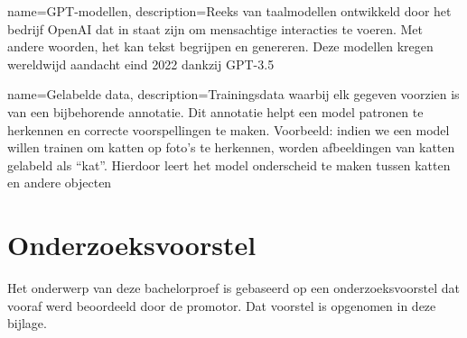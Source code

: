 \documentclass[dutch,dit,thesis]{hogentreport}
\begin{document}
{
    name=GPT-modellen,
    description={Reeks van taalmodellen ontwikkeld door het bedrijf OpenAI dat in staat zijn om mensachtige interacties te voeren. Met andere woorden, het kan tekst begrijpen en genereren. Deze modellen kregen wereldwijd aandacht eind 2022 dankzij GPT-3.5}
}

{
    name=Gelabelde data,
    description={Trainingsdata waarbij elk gegeven voorzien is van een bijbehorende annotatie. Dit annotatie helpt een model patronen te herkennen en correcte voorspellingen te maken. Voorbeeld: indien we een model willen trainen om katten op foto's te herkennen, worden afbeeldingen van katten gelabeld als ``kat''. Hierdoor leert het model onderscheid te maken tussen katten en andere objecten}
}

\printglossary{}
\printglossary[type=\acronymtype]


\mainmatter{}







%
%






\appendix

\chapter{Onderzoeksvoorstel}

Het onderwerp van deze bachelorproef is gebaseerd op een onderzoeksvoorstel dat vooraf werd beoordeeld door de promotor. Dat voorstel is opgenomen in deze bijlage.

\end{document}
